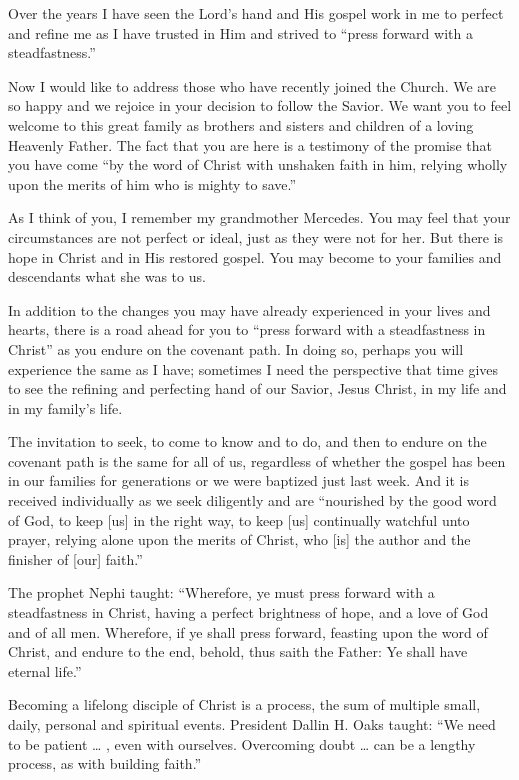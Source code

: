 \documentclass[letterpaper, 11pt]{report}
\begin{document}
Over the years I have seen the Lord’s hand and His gospel work in me to perfect and refine me as I have trusted in Him and strived to “press forward with a steadfastness.”

Now I would like to address those who have recently joined the Church. We are so happy and we rejoice in your decision to follow the Savior. We want you to feel welcome to this great family as brothers and sisters and children of a loving Heavenly Father. The fact that you are here is a testimony of the promise that you have come “by the word of Christ with unshaken faith in him, relying wholly upon the merits of him who is mighty to save.”

As I think of you, I remember my grandmother Mercedes. You may feel that your circumstances are not perfect or ideal, just as they were not for her. But there is hope in Christ and in His restored gospel. You may become to your families and descendants what she was to us.

In addition to the changes you may have already experienced in your lives and hearts, there is a road ahead for you to “press forward with a steadfastness in Christ” as you endure on the covenant path. In doing so, perhaps you will experience the same as I have; sometimes I need the perspective that time gives to see the refining and perfecting hand of our Savior, Jesus Christ, in my life and in my family’s life.

The invitation to seek, to come to know and to do, and then to endure on the covenant path is the same for all of us, regardless of whether the gospel has been in our families for generations or we were baptized just last week. And it is received individually as we seek diligently and are “nourished by the good word of God, to keep [us] in the right way, to keep [us] continually watchful unto prayer, relying alone upon the merits of Christ, who [is] the author and the finisher of [our] faith.”

The prophet Nephi taught: “Wherefore, ye must press forward with a steadfastness in Christ, having a perfect brightness of hope, and a love of God and of all men. Wherefore, if ye shall press forward, feasting upon the word of Christ, and endure to the end, behold, thus saith the Father: Ye shall have eternal life.”

Becoming a lifelong disciple of Christ is a process, the sum of multiple small, daily, personal and spiritual events. President Dallin H. Oaks taught: “We need to be patient … , even with ourselves. Overcoming doubt … can be a lengthy process, as with building faith.”
\end{document}
